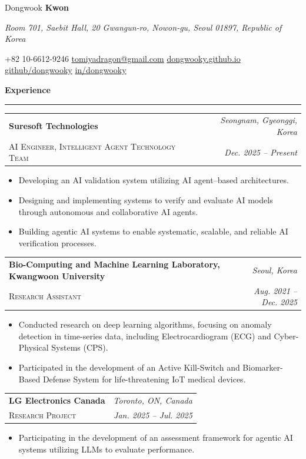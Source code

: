 \documentclass[11pt,letterpaper]{article}
\makeatletter
\newcommand{\awesomesection}[2]{%
  \vspace{0.5em}\par\noindent
  {\fontsize{16pt}{18pt}\bfseries\color{awesomered}#1\color{ink}#2}%
  \par\vspace{-0.5em}%
  {\color{ink}\rule{\linewidth}{0.5pt}}\par
  \vspace{0.3em}%
}
\newcommand{\entry}[4]{%
  \begin{tabularx}{\linewidth}{@{}X r@{}}
    {\fontsize{10.5pt}{12pt}\bfseries #1} & {\fontsize{9.5pt}{11pt}\itshape\color{awesomesoft} #2} \\[0.05em]
    {\fontsize{8.8pt}{10pt}\scshape #3} & {\fontsize{9.5pt}{11pt}\itshape\color{awesomesoft} #4} \\
  \end{tabularx}\par\vspace{0.15em}
}
\makeatother
\begin{document}
\fontsize{9pt}{11.5pt}\selectfont

\begin{center}
  {\fontsize{32pt}{36pt}\selectfont Dongwook }%
  {\fontsize{32pt}{36pt}\bfseries Kwon}\par
  \vspace{0.15em}
  {\fontsize{9pt}{11pt}\itshape\color{muted} Room 701, Saebit Hall, 20 Gwangun-ro, Nowon-gu, Seoul 01897, Republic of Korea}\par
  \vspace{0.3em}
  {\fontsize{8.8pt}{10.5pt}\selectfont
    +82 10-6612-9246 \enspace{$|$}\enspace
    \href{mailto:tomiyadragon@gmail.com}{tomiyadragon@gmail.com} \enspace{$|$}\enspace
    \href{https://dongwooky.github.io}{dongwooky.github.io} \enspace{$|$}\enspace
    \href{https://github.com/dongwooky}{github/dongwooky} \enspace{$|$}\enspace
    \href{https://linkedin.com/in/dongwooky}{in/dongwooky}
  }
\end{center}

\awesomesection{Exp}{erience}

\entry{Suresoft Technologies}{Seongnam, Gyeonggi, Korea}{AI Engineer, Intelligent Agent Technology Team}{Dec. 2025 -- Present}
\begin{itemize}
  \item Developing an AI validation system utilizing AI agent--based architectures.
  \item Designing and implementing systems to verify and evaluate AI models through autonomous and collaborative AI agents.
  \item Building agentic AI systems to enable systematic, scalable, and reliable AI verification processes.
\end{itemize}

\entry{Bio-Computing and Machine Learning Laboratory, Kwangwoon University}{Seoul, Korea}{Research Assistant}{Aug. 2021 -- Dec. 2025}
\begin{itemize}
  \item Conducted research on deep learning algorithms, focusing on anomaly detection in time-series data, including Electrocardiogram (ECG) and Cyber-Physical Systems (CPS).
  \item Participated in the development of an Active Kill-Switch and Biomarker-Based Defense System for life-threatening IoT medical devices.
\end{itemize}

\entry{LG Electronics Canada}{Toronto, ON, Canada}{Research Project}{Jan. 2025 -- Jul. 2025}
\begin{itemize}
  \item Participating in the development of an assessment framework for agentic AI systems utilizing LLMs to evaluate performance.
\end{itemize}
\end{document}
